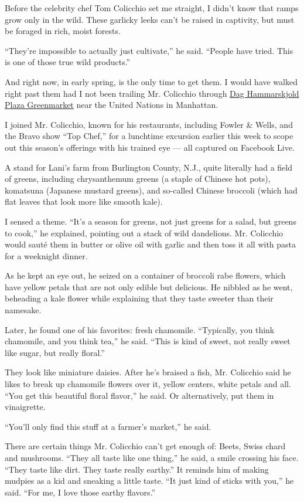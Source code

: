Before the celebrity chef Tom Colicchio set me straight, I didn't know
that ramps grow only in the wild. These garlicky leeks can't be raised
in captivity, but must be foraged in rich, moist forests.

``They're impossible to actually just cultivate,'' he said. ``People
have tried. This is one of those true wild products.''

And right now, in early spring, is the only time to get them. I would
have walked right past them had I not been trailing Mr. Colicchio
through
\href{https://www.grownyc.org/greenmarket/manhattan/dag-hammarskjold}{Dag
Hammarskjold Plaza Greenmarket} near the United Nations in Manhattan.

I joined Mr. Colicchio, known for his restaurants, including Fowler \&
Wells, and the Bravo show ``Top Chef,'' for a lunchtime excursion
earlier this week to scope out this season's offerings with his trained
eye --- all captured on Facebook Live.

A stand for Lani's farm from Burlington County, N.J., quite literally
had a field of greens, including chrysanthemum greens (a staple of
Chinese hot pots), komatsuna (Japanese mustard greens), and so-called
Chinese broccoli (which had flat leaves that look more like smooth
kale).

I sensed a theme. ``It's a season for greens, not just greens for a
salad, but greens to cook,'' he explained, pointing out a stack of wild
dandelions. Mr. Colicchio would sauté them in butter or olive oil with
garlic and then toss it all with pasta for a weeknight dinner.

As he kept an eye out, he seized on a container of broccoli rabe
flowers, which have yellow petals that are not only edible but
delicious. He nibbled as he went, beheading a kale flower while
explaining that they taste sweeter than their namesake.

Later, he found one of his favorites: fresh chamomile. ``Typically, you
think chamomile, and you think tea,'' he said. ``This is kind of sweet,
not really sweet like sugar, but really floral.''

They look like miniature daisies. After he's braised a fish, Mr.
Colicchio said he likes to break up chamomile flowers over it, yellow
centers, white petals and all. ``You get this beautiful floral flavor,''
he said. Or alternatively, put them in vinaigrette.

``You'll only find this stuff at a farmer's market,'' he said.

There are certain things Mr. Colicchio can't get enough of: Beets, Swiss
chard and mushrooms. ``They all taste like one thing,'' he said, a smile
crossing his face. ``They taste like dirt. They taste really earthy.''
It reminds him of making mudpies as a kid and sneaking a little taste.
``It just kind of sticks with you,'' he said. ``For me, I love those
earthy flavors.''

